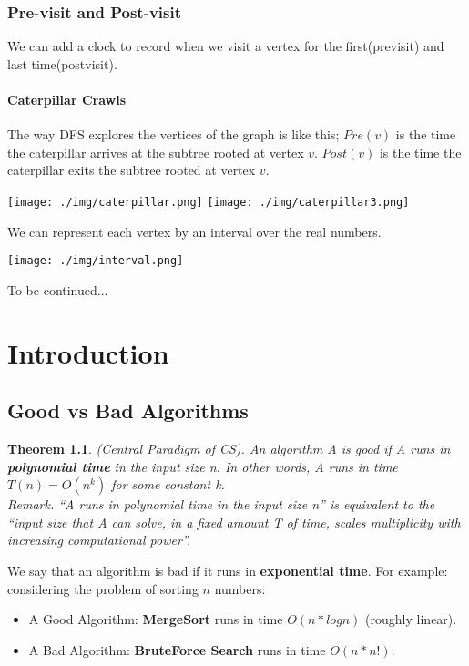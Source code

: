\documentclass[11pt, a4paper, oneside]{book}
\theoremstyle{theoremdd}
\newtheorem{theorem}{Theorem}[chapter]
\theoremstyle{remark}
\begin{document}
\subsection*{Pre-visit and Post-visit}
We can add a clock to record when we visit a vertex for the first(previsit) and last time(postvisit). 
\subsubsection*{Caterpillar Crawls}
The way DFS explores the vertices of the graph is like this; $Pre(v)$ is the time the caterpillar arrives at the subtree rooted at vertex $v$. $Post(v)$ is the time the caterpillar exits the subtree rooted at vertex $v$.
\begin{center}
\texttt{[image: ./img/caterpillar.png]}
\texttt{[image: ./img/caterpillar3.png]}
\end{center}
We can represent each vertex by an interval over the real numbers. 
\begin{center}
\texttt{[image: ./img/interval.png]}
\end{center}

To be continued...


\chapter{Introduction}
\section*{Good vs Bad Algorithms}
\begin{theorem}
(Central Paradigm of CS). An algorithm A is good if A runs in \textbf{polynomial time} in the input size n. In other words, A runs in time $T(n)=O(n^{k})$ for some constant k. \\
Remark. ``A runs in polynomial time in the input size n'' is equivalent to the ``input size that A can solve, in a fixed amount T of time, scales multiplicity with increasing computational power''. 
\end{theorem}

We say that an algorithm is bad if it runs in \textbf{exponential time}. For example: considering the problem of sorting $n$ numbers: 
\begin{itemize}
	\item A Good Algorithm: \textbf{MergeSort} runs in time $O(n*logn)$ (roughly linear).
	\item A Bad Algorithm: \textbf{BruteForce Search} runs in time $O(n*n!)$. 
\end{itemize}
\end{document}
